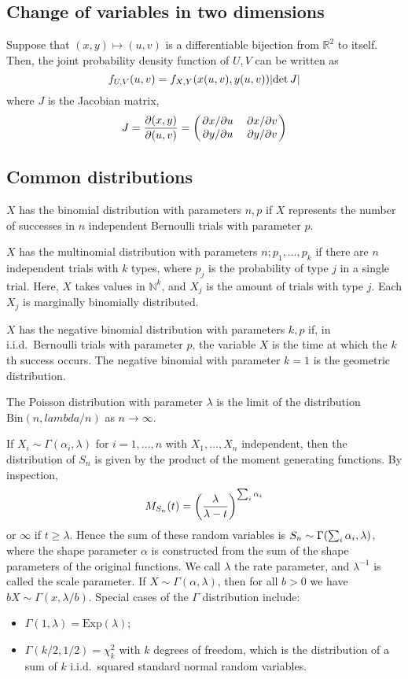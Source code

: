 \subsection{Change of variables in two dimensions}
Suppose that \( (x, y) \mapsto (u,v) \) is a differentiable bijection from \( \mathbb R^2 \) to itself.
Then, the joint probability density function of \( U,V \) can be written as
\[ f_{U,V}(u,v) = f_{X,Y}(x(u,v), y(u,v)) \abs{\det J} \]
where \( J \) is the Jacobian matrix,
\[ J = \pdv{(x,y)}{(u,v)} = \begin{pmatrix}
	\pdv*{x}{u} & \pdv*{x}{v} \\
	\pdv*{y}{u} & \pdv*{y}{v}
\end{pmatrix} \]

\subsection{Common distributions}
\( X \) has the binomial distribution with parameters \( n, p \) if \( X \) represents the number of successes in \( n \) independent Bernoulli trials with parameter \( p \).

\( X \) has the multinomial distribution with parameters \( n; p_1, \dots, p_k \) if there are \( n \) independent trials with \( k \) types, where \( p_j \) is the probability of type \( j \) in a single trial.
Here, \( X \) takes values in \( \mathbb N^k \), and \( X_j \) is the amount of trials with type \( j \).
Each \( X_j \) is marginally binomially distributed.

\( X \) has the negative binomial distribution with parameters \( k, p \) if, in i.i.d.\ Bernoulli trials with parameter \( p \), the variable \( X \) is the time at which the \( k \)th success occurs.
The negative binomial with parameter \( k = 1 \) is the geometric distribution.

The Poisson distribution with parameter \( \lambda \) is the limit of the distribution \( \mathrm{Bin}(n, lambda/n) \) as \( n \to \infty \).

If \( X_i \sim \Gamma(\alpha_i, \lambda) \) for \( i = 1, \dots, n \) with \( X_1, \dots, X_n \) independent, then the distribution of \( S_n \) is given by the product of the moment generating functions.
By inspection,
\[ M_{S_n}(t) = \qty(\frac{\lambda}{\lambda - t})^{\sum_i \alpha_i} \]
or \( \infty \) if \( t \geq \lambda \).
Hence the sum of these random variables is \( S_n \sim \Gamma\qty(\sum_{i} \alpha_i, \lambda) \), where the shape parameter \( \alpha \) is constructed from the sum of the shape parameters of the original functions.
We call \( \lambda \) the rate parameter, and \( \lambda^{-1} \) is called the scale parameter.
If \( X \sim \Gamma(\alpha, \lambda) \), then for all \( b > 0 \) we have \( bX \sim \Gamma(x, \lambda/b) \).
Special cases of the \( \Gamma \) distribution include:
\begin{itemize}
	\item \( \Gamma(1, \lambda) = \mathrm{Exp}(\lambda) \);
	\item \( \Gamma(k/2, 1/2) = \chi_k^2 \) with \( k \) degrees of freedom, which is the distribution of a sum of \( k \) i.i.d.\ squared standard normal random variables.
\end{itemize}
